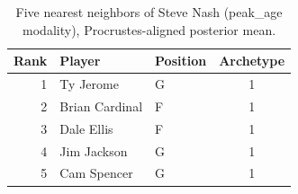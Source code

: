\begin{table}[htbp]
  \centering\small
  \begin{tabular}{rllc}
    \toprule
    Rank & Player & Position & Archetype \\
    \midrule
    1 & Ty Jerome & G & 1 \\
    2 & Brian Cardinal & F & 1 \\
    3 & Dale Ellis & F & 1 \\
    4 & Jim Jackson & G & 1 \\
    5 & Cam Spencer & G & 1 \\
    \bottomrule
  \end{tabular}
  \caption{Five nearest neighbors of Steve Nash (peak_age modality), Procrustes-aligned posterior mean.}
  \label{tab:Steve_Nash_neighbors_peak_age}
\end{table}

